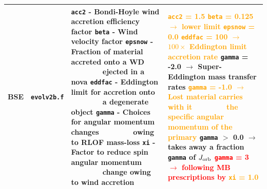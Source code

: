 \begin{landscape}
\begin{table}
\begin{tabular}{|l|l|l|l|}
				\hline \textbf{BSE} & \texttt{evolv2b.f} & \makecell[l]{\texttt{acc2} - Bondi-Hoyle wind accretion efficiency factor \\ \texttt{beta} - Wind velocity factor \\ \texttt{epsnow} - Fraction of material accreted onto a WD \\ $\qquad\qquad$ ejected in a nova \\ \texttt{eddfac} - Eddington limit for accretion onto \\ $\qquad\qquad$ a degenerate object \\ \texttt{gamma} - Choices for angular momentum changes \\ $\qquad\qquad$ owing to RLOF mass-loss \\ \texttt{xi} - Factor to reduce spin angular momentum \\ $\qquad\qquad$ change owing to wind accretion} & \makecell[l]{\textcolor{orange}{\texttt{acc2} = 1.5} \cite{BondiHoyle1944} \\ \textcolor{orange}{\texttt{beta} = 0.125 $\rightarrow$ lower limit} \cite{Hurley2002}  \\ \textcolor{orange}{\texttt{epsnow} = 0.0} \cite{Hurley2002}\\ \textcolor{orange}{\texttt{eddfac} = 100 $\rightarrow$ $100 \times$ Eddington limit accretion rate} \cite{Hurley2002} \\ \texttt{gamma} = -2.0 $\rightarrow$  Super-Eddington mass transfer rates \cite{Hurley2002} \\ \textcolor{orange}{\texttt{gamma} = -1.0 $\rightarrow$ Lost material carries with it} \\  $\qquad\qquad$ \textcolor{orange}{the specific angular momentum of the primary} \cite{Hurley2002} \\ \texttt{gamma} $>$ 0.0  $\rightarrow$ takes away a fraction \texttt{gamma} of $J_{\rm orb}$ \cite{Hurley2002} \\ \textcolor{red}{\texttt{gamma} = 3  $\rightarrow$ following MB prescriptions by} \cite{Rappaportetal1983,Bellonietal2018c}\\ \textcolor{orange}{\texttt{xi} = 1.0} \cite{Hurley2002}}\\ 
				\hline \hline
			\end{tabular}

\end{table}
\end{landscape}
